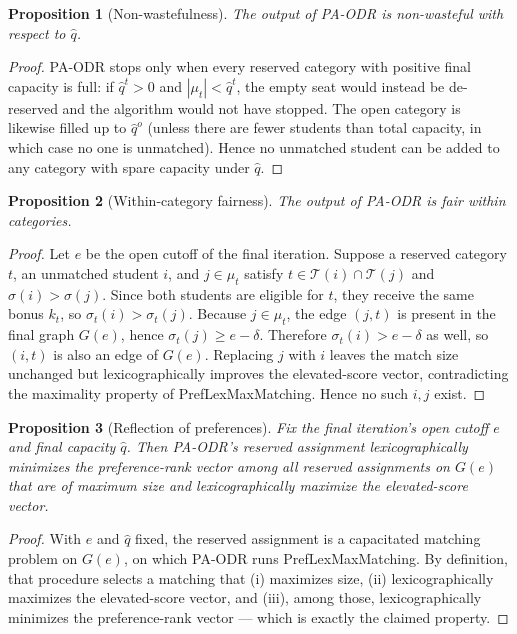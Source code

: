 \documentclass[10pt]{article}
\newtheorem{proposition}{Proposition}
\newcommand{\T}{\mathcal{T}}
\newcommand{\1}{\mathbf{1}}
\begin{document}
\begin{proposition}[Non-wastefulness]\label{prop:pa-odr-nonwaste}
The output of PA-ODR is non-wasteful with respect to $\hat q$.
\end{proposition}
\begin{proof}
PA-ODR stops only when every reserved category with positive final capacity is full: if $\hat q^t>0$ and $|\mu_t|<\hat q^t$, the empty seat would instead be de-reserved and the algorithm would not have stopped. The open category is likewise filled up to $\hat q^o$ (unless there are fewer students than total capacity, in which case no one is unmatched). Hence no unmatched student can be added to any category with spare capacity under $\hat q$.
\end{proof}

\begin{proposition}[Within-category fairness]\label{prop:pa-odr-within}
The output of PA-ODR is fair within categories.
\end{proposition}
\begin{proof}
Let $e$ be the open cutoff of the final iteration. Suppose a reserved category $t$, an unmatched student $i$, and $j\in\mu_t$ satisfy $t\in\T(i)\cap\T(j)$ and $\sigma(i)>\sigma(j)$. Since both students are eligible for $t$, they receive the same bonus $k_t$, so $\sigma_t(i)>\sigma_t(j)$. Because $j\in\mu_t$, the edge $(j,t)$ is present in the final graph $G(e)$, hence $\sigma_t(j)\ge e-\delta$. Therefore $\sigma_t(i)>e-\delta$ as well, so $(i,t)$ is also an edge of $G(e)$. Replacing $j$ with $i$ leaves the match size unchanged but lexicographically improves the elevated-score vector, contradicting the maximality property of PrefLexMaxMatching. Hence no such $i,j$ exist.
\end{proof}

\begin{proposition}[Reflection of preferences]\label{prop:pa-odr-preference}
Fix the final iteration's open cutoff $e$ and final capacity $\hat q$. Then PA-ODR's reserved assignment lexicographically minimizes the preference-rank vector among all reserved assignments on $G(e)$ that are of maximum size and lexicographically maximize the elevated-score vector.
\end{proposition}
\begin{proof}
With $e$ and $\hat q$ fixed, the reserved assignment is a capacitated matching problem on $G(e)$, on which PA-ODR runs PrefLexMaxMatching. By definition, that procedure selects a matching that (i) maximizes size, (ii) lexicographically maximizes the elevated-score vector, and (iii), among those, lexicographically minimizes the preference-rank vector — which is exactly the claimed property.
\end{proof}
\end{document}
